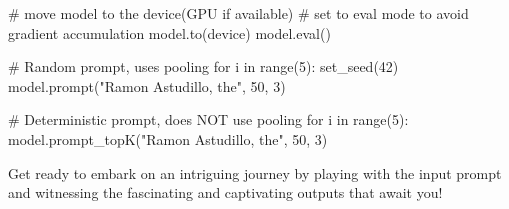 \begin{exercise}
\begin{exercise}
\begin{python}
# move model to the device(GPU if available)
# set to eval mode to avoid gradient accumulation
model.to(device)
model.eval()

# Random prompt, uses pooling
for i in range(5):
    set_seed(42)
    model.prompt("Ramon Astudillo, the", 50, 3)

# Deterministic prompt, does NOT use pooling
for i in range(5):
    model.prompt_topK("Ramon Astudillo, the", 50, 3)
\end{python}

Get ready to embark on an intriguing journey by playing with the input prompt and witnessing the fascinating and captivating outputs that await you!

\end{exercise}

\end{exercise}